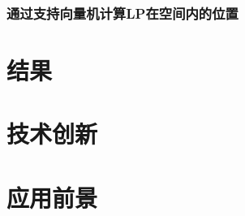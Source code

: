\documentclass[UTF8, twocolumn ]{ctexart}
\begin{document}
\subsubsection{通过支持向量机计算LP在空间内的位置}


\section{结果}


\section{技术创新}


\section{应用前景}

\end{document}
